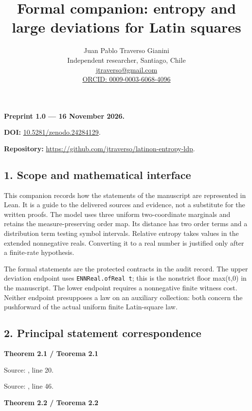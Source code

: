 \documentclass[english,11pt,a4paper]{article}
\title{Formal companion: entropy and large deviations for Latin squares}
\author{Juan Pablo Traverso Gianini\\\small Independent researcher, Santiago, Chile\\\small \href{mailto:jtraverso@gmail.com}{jtraverso@gmail.com}\\\small \href{https://orcid.org/0009-0003-6068-4096}{ORCID: 0009-0003-6068-4096}}
\date{}
\begin{document}
\raggedbottom\maketitle
\textbf{Preprint 1.0 --- 16 November 2026.}

\textbf{DOI:} \href{https://doi.org/10.5281/zenodo.24284129}{10.5281/zenodo.24284129}.

\textbf{Repository:} \url{https://github.com/jtraverso/latinon-entropy-ldp}.

\subsection{1. Scope and mathematical interface}\label{scope-and-mathematical-interface}

This companion records how the statements of the manuscript are represented in Lean. It is a guide to the delivered sources and evidence, not a substitute for the written proofs. The model uses three uniform two-coordinate marginals and retains the measure-preserving order map. Its distance has two order terms and a distribution term testing symbol intervals. Relative entropy takes values in the extended nonnegative reals. Converting it to a real number is justified only after a finite-rate hypothesis.

The formal statements are the protected contracts in the audit record. The upper deviation endpoint uses \texttt{ENNReal.ofReal\ t}; this is the nonstrict floor max(t,0) in the manuscript. The lower endpoint requires a nonnegative finite witness cost. Neither endpoint presupposes a law on an auxiliary collection: both concern the pushforward of the actual uniform finite Latin-square law.

\subsection{2. Principal statement correspondence}\label{principal-statement-correspondence}

\textbf{Theorem 2.1 / Teorema 2.1}


Source: , line 20.


Source: , line 46.

\textbf{Theorem 2.2 / Teorema 2.2}
\end{document}
